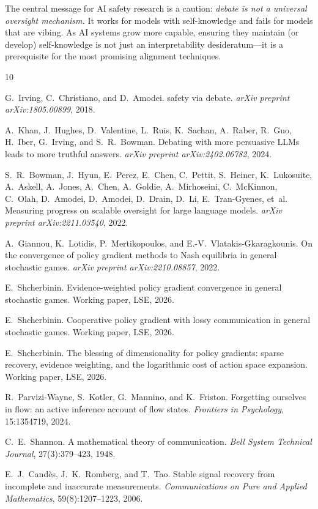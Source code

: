 \documentclass[11pt,a4paper]{article}
\begin{document}
The central message for AI safety research is a caution:
\emph{debate is not a universal oversight mechanism.} It works
for models with self-knowledge and fails for models that are
vibing. As AI systems grow more capable, ensuring they maintain
(or develop) self-knowledge is not just an interpretability
desideratum---it is a prerequisite for the most promising
alignment techniques.


\begin{thebibliography}{10}

G.~Irving, C.~Christiano, and D.~Amodei.
 safety via debate.
\newblock \emph{arXiv preprint arXiv:1805.00899}, 2018.

A.~Khan, J.~Hughes, D.~Valentine, L.~Ruis, K.~Sachan, A.~Raber,
R.~Guo, H.~Iber, G.~Irving, and S.~R.~Bowman.
\newblock Debating with more persuasive {LLMs} leads to more truthful answers.
\newblock \emph{arXiv preprint arXiv:2402.06782}, 2024.

S.~R.~Bowman, J.~Hyun, E.~Perez, E.~Chen, C.~Pettit, S.~Heiner,
K.~Lukosuite, A.~Askell, A.~Jones, A.~Chen, A.~Goldie, A.~Mirhoseini,
C.~McKinnon, C.~Olah, D.~Amodei, D.~Amodei, D.~Drain, D.~Li,
E.~Tran-Gyenes, et~al.
\newblock Measuring progress on scalable oversight for large language models.
\newblock \emph{arXiv preprint arXiv:2211.03540}, 2022.

A.~Giannou, K.~Lotidis, P.~Mertikopoulos, and
E.-V.~Vlatakis-Gkaragkounis.
\newblock On the convergence of policy gradient methods to {N}ash equilibria
in general stochastic games.
\newblock \emph{arXiv preprint arXiv:2210.08857}, 2022.

E.~Shcherbinin.
\newblock Evidence-weighted policy gradient convergence in general stochastic
games.
\newblock Working paper, LSE, 2026.

E.~Shcherbinin.
\newblock Cooperative policy gradient with lossy communication in general
stochastic games.
\newblock Working paper, LSE, 2026.

E.~Shcherbinin.
\newblock The blessing of dimensionality for policy gradients: sparse recovery,
evidence weighting, and the logarithmic cost of action space expansion.
\newblock Working paper, LSE, 2026.

R.~Parvizi-Wayne, S.~Kotler, G.~Mannino, and K.~Friston.
\newblock Forgetting ourselves in flow: an active inference account of flow
states.
\newblock \emph{Frontiers in Psychology}, 15:1354719, 2024.

C.~E.~Shannon.
\newblock A mathematical theory of communication.
\newblock \emph{Bell System Technical Journal}, 27(3):379--423, 1948.

E.~J.~Cand{\`e}s, J.~K.~Romberg, and T.~Tao.
\newblock Stable signal recovery from incomplete and inaccurate measurements.
\newblock \emph{Communications on Pure and Applied Mathematics},
59(8):1207--1223, 2006.

\end{thebibliography}
\end{document}
